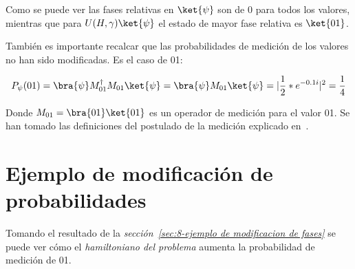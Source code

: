 Como se puede ver las fases relativas  %
en $\ket{\psi}$ son de 0 para todos los valores, mientras que para $U(H, \gamma) \ket{\psi}$ el estado de mayor fase relativa es $\ket{01}$.

También es importante recalcar que las probabilidades de medición de los valores no han sido modificadas. Es el caso de 01:

\begin{align*}
  P_{\psi}(01) = \bra{\psi}M_{01}^\dagger M_{01}\ket{\psi} = \bra{\psi}M_{01}\ket{\psi} = |\frac{1}{2}*e^{-0.1i}|^2 = \frac{1}{4}
\end{align*}

Donde $M_{01} = \bra{01}\ket{01}$ es un operador de medición para el valor 01.
Se han tomado las definiciones del postulado de la medición explicado en~\cite{Nielsen_Chuang_2010}.


\section{Ejemplo de modificación de probabilidades}
Tomando el resultado de la \textit{sección~\ref{sec:8-ejemplo de modificacion de fases}} se puede ver cómo el \textit{hamiltoniano del problema} aumenta la probabilidad de medición de 01.

